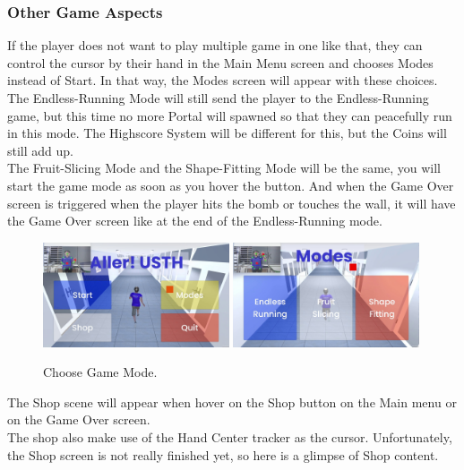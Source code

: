 \documentclass[12pt]{article}
\begin{document}
\clearpage
\subsubsection{Other Game Aspects}
\hspace*{1.5em} If the player does not want to play multiple game in one like that, they can control the cursor by their hand in the Main Menu screen and chooses Modes instead of Start. In that way, the Modes screen will appear with these choices.\\

The Endless-Running Mode will still send the player to the Endless-Running game, but this time no more Portal will spawned so that they can peacefully run in this mode. The Highscore System will be different for this, but the Coins will still add up.\\

The Fruit-Slicing Mode and the Shape-Fitting Mode will be the same, you will start the game mode as soon as you hover the button. And when the Game Over screen is triggered when the player hits the bomb or touches the wall, it will have the Game Over screen like at the end of the Endless-Running mode.
\begin{figure}[h]
    \centering
    \includegraphics[width=0.49\textwidth]{game11.jpg}
    \includegraphics[width=0.49\textwidth]{game12.jpg}
    \caption{Choose Game Mode.}
\end{figure}

The Shop scene will appear when hover on the Shop button on the Main menu or on the Game Over screen.\\

The shop also make use of the Hand Center tracker as the cursor. Unfortunately, the Shop screen is not really finished yet, so here is a glimpse of Shop content.
\end{document}
